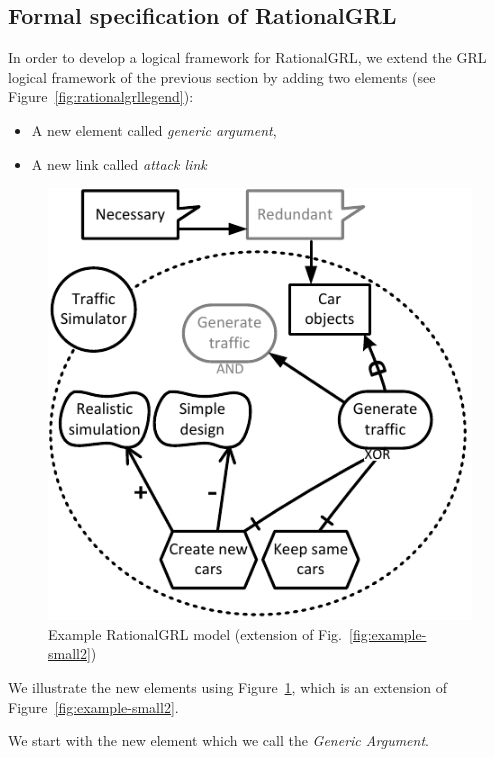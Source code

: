 \subsection{Formal specification of RationalGRL}
\label{sect:formalframework:rationalgrl}

In order to develop a logical framework for RationalGRL, we extend the GRL logical framework of the previous section by adding two elements (see Figure~\ref{fig:rationalgrllegend}):
\begin{itemize}
\item A new element called \emph{generic argument},
\item A new link called \emph{attack link}
\end{itemize}

\begin{figure}[ht]
\centering
\includegraphics[width=\columnwidth]{img/Example1-new-attack.pdf}
\caption{Example RationalGRL model (extension of Fig.~\ref{fig:example-small2})}
\label{fig:example-small3}
\end{figure} 

We illustrate the new elements using Figure~\ref{fig:example-small3}, which is an extension of Figure~\ref{fig:example-small2}. 

We start with the new element which we call the \emph{Generic Argument}.

